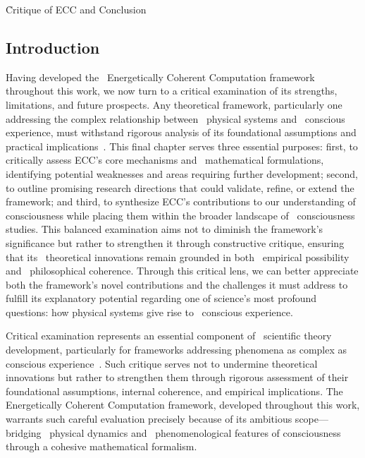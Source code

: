 \h{Critique of ECC and Conclusion}

\begin{refsection}

    \subsection*{Introduction}

    Having developed the~ Energetically Coherent Computation framework throughout this work, we now turn to a critical examination of its strengths, limitations, and future prospects. Any theoretical framework, particularly one addressing the complex relationship between~ physical systems and~ conscious experience, must withstand rigorous analysis of its foundational assumptions and practical implications~\cite{thompson2014waking, chalmers2010character}. This final chapter serves three essential purposes: first, to critically assess ECC's core mechanisms and~ mathematical formulations, identifying potential weaknesses and areas requiring further development; second, to outline promising research directions that could validate, refine, or extend the framework; and third, to synthesize ECC's contributions to our understanding of consciousness while placing them within the broader landscape of~ consciousness studies. This balanced examination aims not to diminish the framework's significance but rather to strengthen it through constructive critique, ensuring that its~ theoretical innovations remain grounded in both~ empirical possibility and~ philosophical coherence. Through this critical lens, we can better appreciate both the framework's novel contributions and the challenges it must address to fulfill its explanatory potential regarding one of science's most profound questions: how physical systems give rise to~ conscious experience.

    Critical examination represents an essential component of~ scientific theory development, particularly for frameworks addressing phenomena as complex as~ conscious experience~\cite{chalmers2010character, thompson2014waking}. Such critique serves not to undermine theoretical innovations but rather to strengthen them through rigorous assessment of their foundational assumptions, internal coherence, and empirical implications. The~ Energetically Coherent Computation framework, developed throughout this work, warrants such careful evaluation precisely because of its ambitious scope—bridging~ physical dynamics and~ phenomenological features of consciousness through a cohesive mathematical formalism.


\end{refsection}
